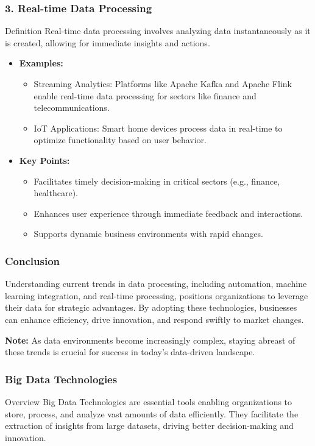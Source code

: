 \documentclass[aspectratio=169]{beamer}
\begin{document}
\begin{frame}[fragile]
    \frametitle{3. Real-time Data Processing}
    \begin{block}{Definition}
        Real-time data processing involves analyzing data instantaneously as it is created, allowing for immediate insights and actions.
    \end{block}
    
    \begin{itemize}
        \item \textbf{Examples:}
        \begin{itemize}
            \item Streaming Analytics: Platforms like Apache Kafka and Apache Flink enable real-time data processing for sectors like finance and telecommunications.
            \item IoT Applications: Smart home devices process data in real-time to optimize functionality based on user behavior.
        \end{itemize}

        \item \textbf{Key Points:}
        \begin{itemize}
            \item Facilitates timely decision-making in critical sectors (e.g., finance, healthcare).
            \item Enhances user experience through immediate feedback and interactions.
            \item Supports dynamic business environments with rapid changes.
        \end{itemize}
    \end{itemize}
\end{frame}

\begin{frame}[fragile]
    \frametitle{Conclusion}
    Understanding current trends in data processing, including automation, machine learning integration, and real-time processing, positions organizations to leverage their data for strategic advantages. 
    By adopting these technologies, businesses can enhance efficiency, drive innovation, and respond swiftly to market changes.
    
    \textbf{Note:} As data environments become increasingly complex, staying abreast of these trends is crucial for success in today's data-driven landscape.
\end{frame}

\begin{frame}
    \frametitle{Big Data Technologies}
    \begin{block}{Overview}
        Big Data Technologies are essential tools enabling organizations to store, process, and analyze vast amounts of data efficiently. They facilitate the extraction of insights from large datasets, driving better decision-making and innovation.
    \end{block}
\end{frame}
\end{document}
